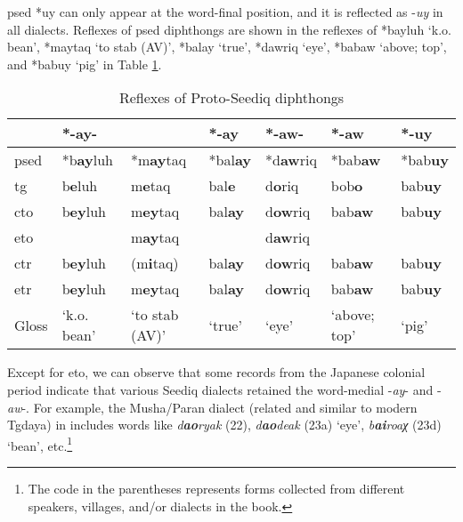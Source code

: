 \acl{psed} *uy can only appear at the word-final position, and it is reflected as -\textit{uy} in all dialects. Reflexes of \acl{psed} diphthongs are shown in the reflexes of *bayluh `k.o. bean', *maytaq `to stab (AV)', *balay `true', *dawriq `eye', *babaw `above; top', and *babuy `pig' in Table \ref{tab:psed_VV}.

\begin{table}[!htbp]
\centering
\caption{Reflexes of Proto-Seediq diphthongs}
\label{tab:psed_VV}
\begin{tabular}{lllllll}\hline
           & \multicolumn{2}{l}{*-ay-}       & *-ay   & *-aw-   & *-aw         & *-uy   \\ \hline
\acs{psed} & *b\textbf{ay}luh  & *m\textbf{ay}taq   & *bal\textbf{ay} & *d\textbf{aw}riq & *bab\textbf{aw}       & *bab\textbf{uy} \\ \hdashline
\acs{tg}   & b\textbf{e}luh    & m\textbf{e}taq     & bal\textbf{e}   & d\textbf{o}riq   & bob\textbf{o}         & bab\textbf{uy}  \\
\acs{cto}  & b\textbf{ey}luh   & m\textbf{ey}taq    & bal\textbf{ay}  & d\textbf{ow}riq  & bab\textbf{aw}        & bab\textbf{uy}  \\
\acs{eto}  &                   & m\textbf{ay}taq    &                 & d\textbf{aw}riq  &              &        \\
\acs{ctr}  & b\textbf{ey}luh   & (m\textbf{i}taq)   & bal\textbf{ay}  & d\textbf{ow}riq  & bab\textbf{aw}        & bab\textbf{uy}  \\
\acs{etr}  & b\textbf{ey}luh   & m\textbf{ey}taq    & bal\textbf{ay}  & d\textbf{ow}riq  & bab\textbf{aw}        & bab\textbf{uy}  \\ \hline
Gloss      & `k.o. bean'       & `to stab (AV)'     & `true' & `eye'   & `above; top' & `pig' 
\\ \hline
\end{tabular}
\end{table}

Except for \acl{eto}, we can observe that some records from the Japanese colonial period indicate that various Seediq dialects retained the word-medial -\textit{ay}- and -\textit{aw}-. For example, the Musha/Paran dialect (related and similar to modern Tgdaya) in \textcite{ogawa2006voc} includes words like \textit{d\textbf{ao}ryak} (22), \textit{d\textbf{ao}deak} (23a) `eye', \textit{b\textbf{ai}roaχ} (23d) `bean', etc.\footnote{The code in the parentheses represents forms collected from different speakers, villages, and/or dialects in the book.} 

